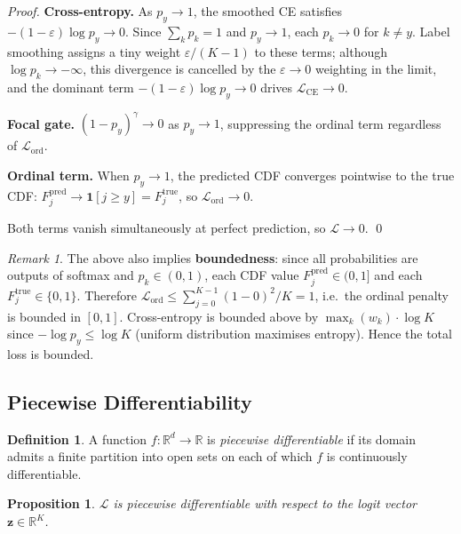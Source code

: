 \documentclass[12pt, a4paper]{article}
\newtheorem{proposition}{Proposition}
\theoremstyle{definition}
\newtheorem{definition}{Definition}
\theoremstyle{remark}
\newtheorem{remark}{Remark}
\begin{document}
\begin{proof}
\textbf{Cross-entropy.}  As $p_y \to 1$, the smoothed CE satisfies
$-(1-\varepsilon)\log p_y \to 0$. Since $\sum_k p_k = 1$ and $p_y \to 1$,
each $p_k \to 0$ for $k \neq y$. Label smoothing assigns a tiny weight
$\varepsilon/(K-1)$ to these terms; although $\log p_k \to -\infty$, this
divergence is cancelled by the $\varepsilon \to 0$ weighting in the limit,
and the dominant term $-(1-\varepsilon)\log p_y \to 0$ drives
$\mathcal{L}_{\mathrm{CE}} \to 0$.

\textbf{Focal gate.}  $(1-p_y)^{\gamma} \to 0$ as $p_y \to 1$, suppressing
the ordinal term regardless of $\mathcal{L}_{\mathrm{ord}}$.

\textbf{Ordinal term.}  When $p_y \to 1$, the predicted CDF converges
pointwise to the true CDF: $F_j^{\mathrm{pred}} \to \mathbf{1}[j \geq y] =
F_j^{\mathrm{true}}$, so $\mathcal{L}_{\mathrm{ord}} \to 0$.

Both terms vanish simultaneously at perfect prediction, so $\mathcal{L} \to 0$. \qed
\end{proof}

\begin{remark}
The above also implies \textbf{boundedness}: since all probabilities are
outputs of softmax and $p_k \in (0,1)$, each CDF value $F_j^{\mathrm{pred}}
\in (0,1]$ and each $F_j^{\mathrm{true}} \in \{0,1\}$. Therefore
$\mathcal{L}_{\mathrm{ord}} \leq \sum_{j=0}^{K-1}(1-0)^2/K = 1$, i.e.\
the ordinal penalty is bounded in $[0,1]$.
Cross-entropy is bounded above by $\max_k(w_k)\cdot\log K$
since $-\log p_y \leq \log K$ (uniform distribution maximises entropy).
Hence the total loss is bounded.
\end{remark}

\subsection{Piecewise Differentiability}

\begin{definition}
A function $f: \mathbb{R}^d \to \mathbb{R}$ is \emph{piecewise
differentiable} if its domain admits a finite partition into open sets
on each of which $f$ is continuously differentiable.
\end{definition}

\begin{proposition}
$\mathcal{L}$ is piecewise differentiable with respect to the logit
vector $\mathbf{z} \in \mathbb{R}^K$.
\end{proposition}
\end{document}
